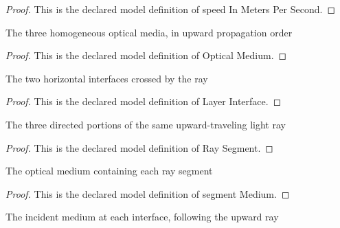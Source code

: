 \begin{proof}
  This is the declared model definition of speed In Meters Per Second.
\end{proof}
\begin{definition}
  \label{def:physics:phyx-mini-0091:phyxminiproblems-problemphyxmini0091-opticalmedium}
  The three homogeneous optical media, in upward propagation order
\end{definition}
\begin{proof}
  This is the declared model definition of Optical Medium.
\end{proof}
\begin{definition}
  \label{def:physics:phyx-mini-0091:phyxminiproblems-problemphyxmini0091-layerinterface}
  The two horizontal interfaces crossed by the ray
\end{definition}
\begin{proof}
  This is the declared model definition of Layer Interface.
\end{proof}
\begin{definition}
  \label{def:physics:phyx-mini-0091:phyxminiproblems-problemphyxmini0091-raysegment}
  The three directed portions of the same upward-traveling light ray
\end{definition}
\begin{proof}
  This is the declared model definition of Ray Segment.
\end{proof}
\begin{definition}
  \label{def:physics:phyx-mini-0091:phyxminiproblems-problemphyxmini0091-segmentmedium}
  The optical medium containing each ray segment
\end{definition}
\begin{proof}
  This is the declared model definition of segment Medium.
\end{proof}
\begin{definition}
  \label{def:physics:phyx-mini-0091:phyxminiproblems-problemphyxmini0091-incidentmedium}
  The incident medium at each interface, following the upward ray
\end{definition}

